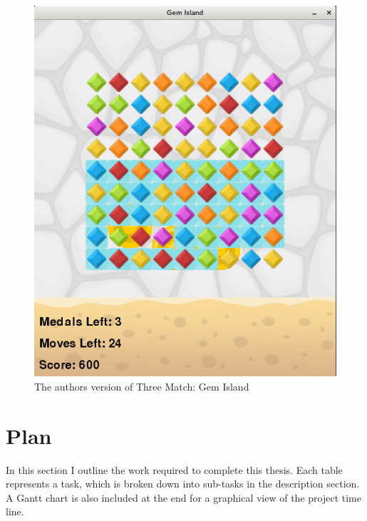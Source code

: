 \documentclass{bhamthesis}
\theoremstyle{definition}
\begin{document}
\begin{figure}
\begin{center}
\includegraphics[scale=.3]{media/img/gem_island.png} 
\caption{The authors version of Three Match: Gem Island}
\label{f.gemisland}
\end{center}
\end{figure}



\section{Plan}

In this section I outline the work required to complete this thesis. Each table represents a task, which is broken down into sub-tasks in the description section. A Gantt chart is also included at the end for a graphical view of the project time line.
\end{document}
